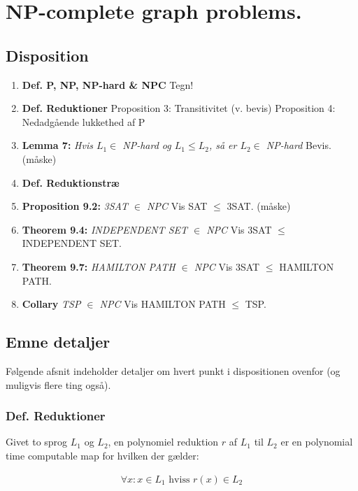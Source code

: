 \section{NP-complete graph problems.}

\subsection{Disposition}

\begin{enumerate}
 \item \textbf{Def. P, NP, NP-hard \& NPC}
    \subitem  Tegn!
 \item \textbf{Def. Reduktioner}
    \subitem  Proposition 3: Transitivitet (v. bevis)
    \subitem  Proposition 4: Nedadgående lukkethed af P  
 \item \textbf{Lemma 7:} \textit{Hvis $L_1 \in$ NP-hard og $L_1 \leq L_2$, så er $L_2 \in$ NP-hard}
    \subitem  Bevis. (måske)
 \item \textbf{Def. Reduktionstræ}
 \item \textbf{Proposition 9.2:} \textit{3SAT $\in$ NPC}
    \subitem Vis SAT $\leq$ 3SAT. (måske)
 \item \textbf{Theorem 9.4:} \textit{INDEPENDENT SET $\in$ NPC}
    \subitem Vis 3SAT $\leq$ INDEPENDENT SET.
 \item \textbf{Theorem 9.7:} \textit{HAMILTON PATH $\in$ NPC}
    \subitem Vis 3SAT $\leq$ HAMILTON PATH.
 \item \textbf{Collary} \textit{TSP $\in$ NPC}
    \subitem Vis HAMILTON PATH $\leq$ TSP.
\end{enumerate}

\subsection{Emne detaljer}

Følgende afsnit indeholder detaljer om hvert punkt i dispositionen ovenfor (og
muligvis flere ting også).

\subsubsection{Def. Reduktioner}

Givet to sprog $L_1$ og $L_2$, en polynomiel reduktion $r$ af $L_1$ til $L_2$
er en polynomial time computable map for hvilken der gælder:

\begin{align*}
 \forall x : x \in L_1 \text{ hviss } r(x) \in L_2
\end{align*}

